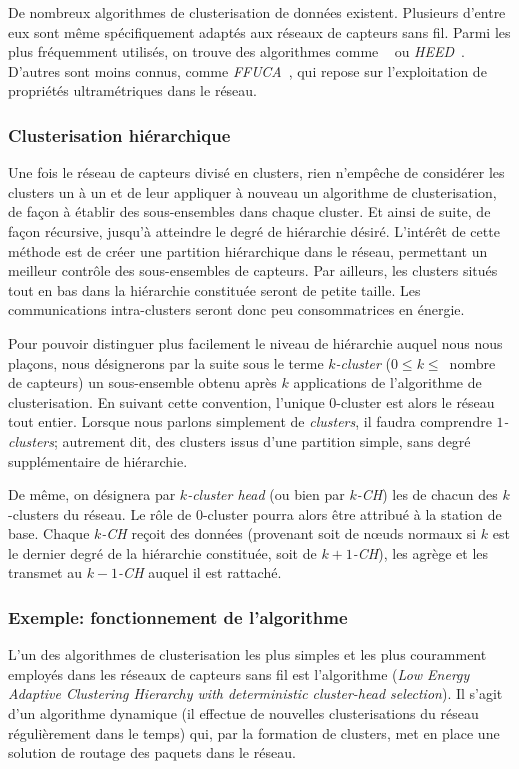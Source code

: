 De nombreux algorithmes de clusterisation de données existent.
Plusieurs d'entre eux sont même spécifiquement adaptés aux réseaux de capteurs sans fil.
Parmi les plus fréquemment utilisés, on trouve des algorithmes comme \leach~\cite{HCB00} ou \textit{HEED}~\cite{YF04}.
D'autres sont moins connus, comme \textit{FFUCA}~\cite{FL11}, qui repose sur l'exploitation de propriétés ultramétriques dans le réseau.

        \subsubsection{Clusterisation hiérarchique}
Une fois le réseau de capteurs divisé en clusters, rien n'empêche de considérer les clusters un à un et de leur appliquer à nouveau un algorithme de clusterisation, de façon à établir des sous-ensembles dans chaque cluster.
Et ainsi de suite, de façon récursive, jusqu'à atteindre le degré de hiérarchie désiré.
L'intérêt de cette méthode est de créer une partition hiérarchique dans le réseau, permettant un meilleur contrôle des sous-ensembles de capteurs.
Par ailleurs, les clusters situés tout en bas dans la hiérarchie constituée seront de petite taille.
Les communications intra-clusters seront donc peu consommatrices en énergie.

Pour pouvoir distinguer plus facilement le niveau de hiérarchie auquel nous nous plaçons, nous désignerons par la suite sous le terme \textit{$k$-cluster} ($0 \leq k \leq$~nombre de capteurs) un sous-ensemble obtenu après $k$ applications de l'algorithme de clusterisation.
En suivant cette convention, l'unique $0$-cluster est alors le réseau tout entier.
Lorsque nous parlons simplement de \textit{clusters}, il faudra comprendre \textit{$1$-clusters}; autrement dit, des clusters issus d'une partition simple, sans degré supplémentaire de hiérarchie.

De même, on désignera par \textit{$k$-cluster head} (ou bien par \textit{$k$-CH}) les \chs de chacun des $k$-clusters du réseau.
Le rôle de $0$-cluster pourra alors être attribué à la station de base.
Chaque \textit{$k$-CH} reçoit des données (provenant soit de nœuds normaux si $k$ est le dernier degré de la hiérarchie constituée, soit de \textit{$k+1$-CH}), les agrège et les transmet au \textit{$k-1$-CH} auquel il est rattaché.

        \subsubsection{Exemple: fonctionnement de l'algorithme \leach}
        \label{st:subsubsec:leach}
L'un des algorithmes de clusterisation les plus simples et les plus couramment employés dans les réseaux de capteurs sans fil est l'algorithme \leach (\textit{Low Energy Adaptive Clustering Hierarchy with deterministic cluster-head selection}).
Il s'agit d'un algorithme dynamique (il effectue de nouvelles clusterisations du réseau régulièrement dans le temps) qui, par la formation de clusters, met en place une solution de routage des paquets dans le réseau.

